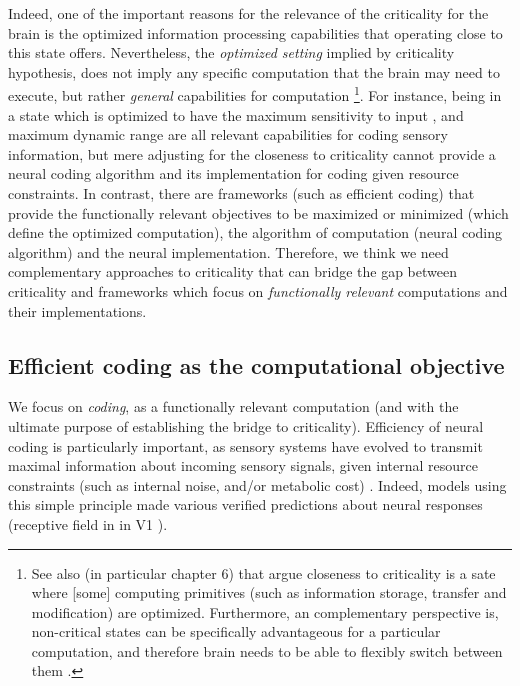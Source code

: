 Indeed, one of the important reasons for the relevance of the criticality for the brain
is the optimized  information processing capabilities that operating close to this state offers.
Nevertheless, the \emph{optimized setting} implied by criticality hypothesis,
does not imply any specific computation that the brain may need to execute,
but rather \emph{general} capabilities for computation
\footnote{
  See also \citet{lizierLocalInformationDynamics2013} (in particular chapter 6) that argue
  closeness to criticality is a sate where [some] computing primitives (such as information storage, transfer and modification) are optimized.
  Furthermore, an complementary perspective is, non-critical states can be specifically advantageous for a particular computation,
  and therefore brain needs to be able to flexibly switch between them \cite{clawsonAdaptationScalefreeDynamics2017,zeraatiStudyingCriticalityIts2017}.
}.
For instance,
being in a state which is optimized to have the maximum sensitivity to input \cite{kinouchiOptimalDynamicalRange2006,brochiniPhaseTransitionsSelforganized2016}, 
and maximum dynamic range
\cite{kinouchiOptimalDynamicalRange2006,larremorePredictingCriticalityDynamic2011,nurProbingSpatialInhomogeneity2019}
are all relevant capabilities for coding sensory information,
but mere adjusting for the closeness to criticality cannot provide a neural coding algorithm and its implementation for coding given resource constraints.
In contrast, there are frameworks (such as efficient coding)
that  provide the functionally relevant objectives to be maximized or minimized
(which define the optimized computation),
the algorithm of computation (neural coding algorithm) and the neural implementation.
Therefore, we think we need complementary approaches to criticality
that can bridge the gap between criticality and frameworks which focus on \emph{functionally relevant} computations and their implementations.

\subsection{Efficient coding as the computational objective}\label{sec:efficient-coding-as}

We focus on \emph{coding}, as a functionally relevant computation
(and with the ultimate purpose of establishing the bridge to criticality). 
Efficiency of neural coding is particularly important, as sensory systems have evolved to transmit maximal information about incoming sensory signals,
given internal resource constraints (such as internal noise, and/or metabolic cost)
\cite[Chapeter 13]{rosenblithSensoryCommunication2012}\cite{fredriekeSpikesExploringNeural1999,quianquirogaPrinciplesNeuralCoding2013}.
Indeed, models using this simple principle made various verified predictions about neural responses
(\eg receptive field in in V1
\cite{olshausenEmergenceSimplecellReceptive1996,simoncelliNaturalImageStatistics2001}).


